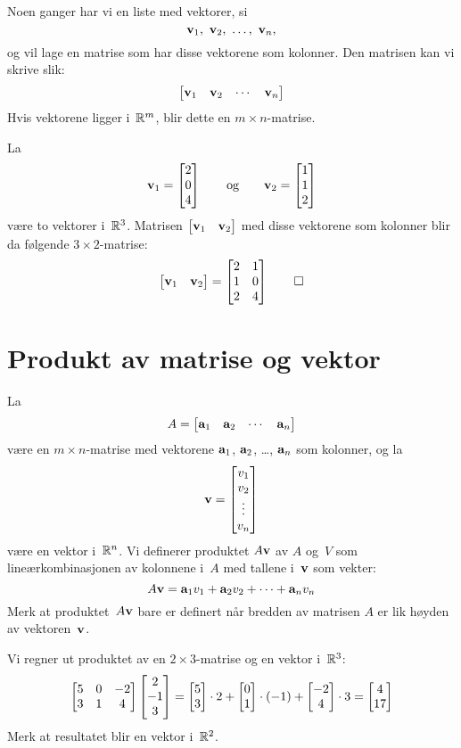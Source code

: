 Noen ganger har vi en liste med vektorer, si
\[
\mathbf{v}_1,\ \mathbf{v}_2,\ \ldots,\ \mathbf{v}_n,
\]
og vil lage en matrise som har disse vektorene som kolonner.
Den matrisen kan vi skrive slik:
\[
\begin{bmatrix}
\mathbf{v}_1 & \mathbf{v}_2 & \cdots & \mathbf{v}_n
\end{bmatrix}
\]
Hvis vektorene ligger i~$\mathbb{R}^m$, blir dette en $m \times n$-matrise.

\begin{ex}
La
\[
\mathbf{v}_1 = \begin{bmatrix} 2 \\ 0 \\ 4 \end{bmatrix}
\qquad\text{og}\qquad
\mathbf{v}_2 = \begin{bmatrix} 1 \\ 1 \\ 2 \end{bmatrix}
\]
være to vektorer i~$\mathbb{R}^3$.  Matrisen
$\begin{bmatrix} \mathbf{v}_1 & \mathbf{v}_2 \end{bmatrix}$ med disse vektorene
som kolonner blir da følgende $3 \times 2$-matrise:
\[
\begin{bmatrix} \mathbf{v}_1 & \mathbf{v}_2 \end{bmatrix}
=
\begin{bmatrix}
2 & 1 \\
1 & 0 \\
2 & 4
\end{bmatrix}
\qedhere
\]
\end{ex}


\section*{Produkt av matrise og vektor}

La
\[
A =
\begin{bmatrix}
\mathbf{a}_1 & \mathbf{a}_2 & \cdots & \mathbf{a}_n
\end{bmatrix}
\]
være en $m \times n$-matrise med vektorene $\mathbf{a}_1$, $\mathbf{a}_2$,
\ldots, $\mathbf{a}_n$ som kolonner, og la
\[
\mathbf{v} = \begin{bmatrix} v_1 \\ v_2 \\ \vdots \\ v_n \end{bmatrix}
\]
være en vektor i~$\mathbb{R}^n$.  Vi definerer produktet $A\mathbf{v}$ av $A$
og~$V$ som lineærkombinasjonen av kolonnene i~$A$ med tallene
i~$\mathbf{v}$ som vekter:
\[
A \mathbf{v} = \mathbf{a}_1 v_1 + \mathbf{a}_2 v_2 + \cdots + \mathbf{a}_n v_n
\]
Merk at produktet~$A \mathbf{v}$ bare er definert når bredden av matrisen
$A$ er lik høyden av vektoren~$\mathbf{v}$.

\begin{ex}
Vi regner ut produktet av en $2 \times 3$-matrise og en vektor
i~$\mathbb{R}^3$:
\[
\begin{bmatrix}
5 & 0 & -2 \\
3 & 1 &  4
\end{bmatrix}
\begin{bmatrix} 2 \\ -1 \\ 3 \end{bmatrix}
=
\begin{bmatrix} 5 \\ 3 \end{bmatrix} \cdot 2 +
\begin{bmatrix} 0 \\ 1 \end{bmatrix} \cdot (-1) +
\begin{bmatrix} -2 \\ 4 \end{bmatrix} \cdot 3
=
\begin{bmatrix} 4 \\ 17 \end{bmatrix}
\]
Merk at resultatet blir en vektor i~$\mathbb{R}^2$.
\end{ex}


